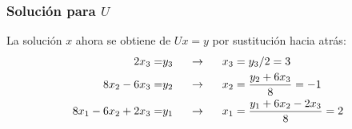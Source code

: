 \begin{frame}[fragile]
\frametitle{Solución para $U$}
La solución $x$ ahora se obtiene de $Ux=y$ por sustitución hacia atrás:
\[ \begin{split}
2x_{3} =& y_{3} \hspace{0.5cm} \rightarrow \hspace{0.5cm} x_{3} = y_{3}/2 = 3 \\
8x_{2} - 6x_{3} =& y_{2} \hspace{0.5cm} \rightarrow \hspace{0.5cm} x_{2} = \dfrac{y_{2} + 6 x_{3}}{8} = -1 \\
8x_{1} - 6x_{2} + 2 x_{3} =& y_{1} \hspace{0.5cm} \rightarrow \hspace{0.5cm} x_{1} = \dfrac{y_{1} + 6 x_{2} - 2x_{3}}{8}=2
\end{split} \]
\end{frame}
